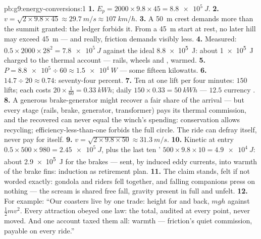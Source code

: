 \begin{solution}{pb:g9:energy-conversions:1}
\textbf{1.} $E_p = 2000 \times 9.8 \times 45 =
\qty{8.8e5}{J}$.
\textbf{2.} $v = \sqrt{2 \times 9.8 \times 45} \approx
\qty{29.7}{m/s} \approx \qty{107}{km/h}$.
\textbf{3.} A \qty{50}{m} crest demands more  than the
summit granted: the ledger forbids it. From a \qty{45}{m}
start at rest, no later hill may exceed \qty{45}{m} --- and
really, friction demands visibly less.
\textbf{4.} Measured: $0.5 \times 2000 \times 28^2 =
\qty{7.8e5}{J}$ against the ideal \qty{8.8e5}{J}: about
\qty{1e5}{J} charged to the thermal account --- rails,
wheels and , warmed.
\textbf{5.} $P = \num{8.8e5} \div 60 \approx
\qty{1.5e4}{W}$ --- some fifteen kilowatts.
\textbf{6.} $14.7 \div 20 \approx 0.74$: seventy-four
percent.
\textbf{7.} Ten  at one lift per four minutes: $150$
lifts; each costs $20 \times \tfrac{1}{60} =
\qty{0.33}{kWh}$; daily $150 \times 0.33 = \qty{50}{kWh}$
--- $12.5$ currency .
\textbf{8.} A generous brake-generator might recover a fair
share of the arrival  --- but every stage
(rails, brake, generator, transformer) pays its thermal
commission, and the recovered  can never equal the
winch's spending: conservation allows recycling;
efficiency-less-than-one forbids the full circle. The ride
can defray itself, never pay for itself.
\textbf{9.} $v = \sqrt{2 \times 9.8 \times 50} \approx
\qty{31.3}{m/s}$.
\textbf{10.} Kinetic at entry $0.5 \times 500 \times 980 =
\qty{2.45e5}{J}$, plus the last ten ' $500 \times 9.8
\times 10 = \qty{4.9e4}{J}$: about \qty{2.9e5}{J} for the
brakes --- sent, by induced eddy currents, into warmth of
the brake fins: induction as retirement plan.
\textbf{11.} The claim stands, felt if not worded exactly:
gondola and riders fell together, and falling companions
press on nothing --- the scream is shared free fall,
gravity present in full and unfelt.
\textbf{12.} For example: ``Our coasters live by one trade:
height for  and back, $m g h$ against $\frac12 m v^2$.
Every attraction obeyed one law: the  total, audited
at every point, never moved. And one account taxed them
all: warmth --- friction's quiet commission, payable on
every ride.''
\end{solution}

